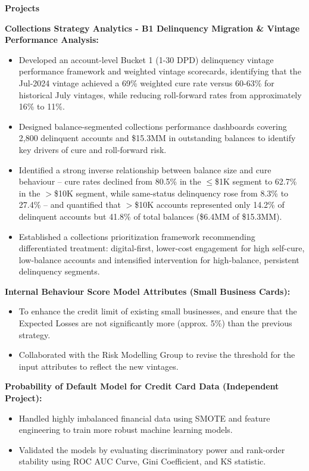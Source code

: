 \documentclass[9.5pt]{article}
\newcommand{\sectionhead}[1]{\vspace{4pt}\textbf{#1}\vspace{1pt}\par}
\begin{document}
\sectionhead{Projects}
\textbf{Collections Strategy Analytics - B1 Delinquency Migration \& Vintage Performance Analysis:}
\begin{itemize}
\item Developed an account-level Bucket 1 (1-30 DPD) delinquency vintage performance framework and weighted vintage scorecards, identifying that the Jul-2024 vintage achieved a 69\% weighted cure rate versus 60-63\% for historical July vintages, while reducing roll-forward rates from approximately 16\% to 11\%.
\item Designed balance-segmented collections performance dashboards covering 2,800 delinquent accounts and \$15.3MM in outstanding balances to identify key drivers of cure and roll-forward risk.
\item Identified a strong inverse relationship between balance size and cure behaviour -- cure rates declined from 80.5\% in the $\leq$\$1K segment to 62.7\% in the $>$\$10K segment, while same-status delinquency rose from 8.3\% to 27.4\% -- and quantified that $>$\$10K accounts represented only 14.2\% of delinquent accounts but 41.8\% of total balances (\$6.4MM of \$15.3MM).
\item Established a collections prioritization framework recommending differentiated treatment: digital-first, lower-cost engagement for high self-cure, low-balance accounts and intensified intervention for high-balance, persistent delinquency segments.
\end{itemize}

\textbf{Internal Behaviour Score Model Attributes (Small Business Cards):}
\begin{itemize}
\item To enhance the credit limit of existing small businesses, and ensure that the Expected Losses are not significantly more (approx. 5\%) than the previous strategy.
\item Collaborated with the Risk Modelling Group to revise the threshold for the input attributes to reflect the new vintages.
\end{itemize}

\textbf{Probability of Default Model for Credit Card Data (Independent Project):}
\begin{itemize}
\item Handled highly imbalanced financial data using SMOTE and feature engineering to train more robust machine learning models.
\item Validated the models by evaluating discriminatory power and rank-order stability using ROC AUC Curve, Gini Coefficient, and KS statistic.
\end{itemize}
\end{document}
